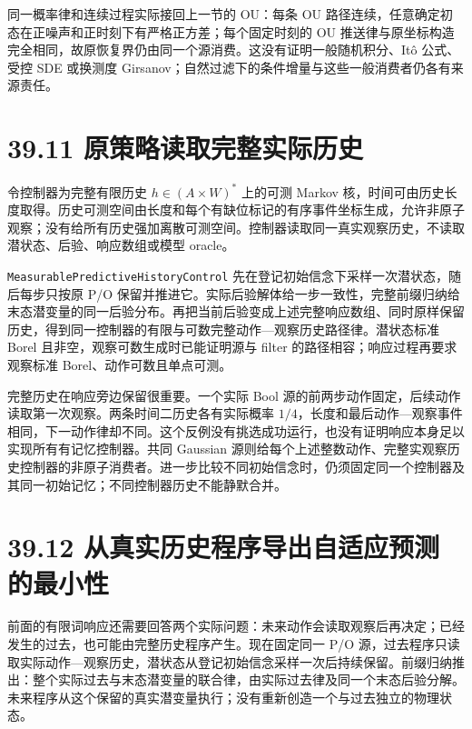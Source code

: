 \documentclass[
  11pt,
  oneside]{book}
\begin{document}
同一概率律和连续过程实际接回上一节的 OU：每条 OU 路径连续，任意确定初态在正噪声和正时刻下有严格正方差；每个固定时刻的 OU 推送律与原坐标构造完全相同，故原恢复界仍由同一个源消费。这没有证明一般随机积分、Itô 公式、受控 SDE 或换测度 Girsanov；自然过滤下的条件增量与这些一般消费者仍各有来源责任。

\section{39.11 原策略读取完整实际历史}\label{ux539fux7b56ux7565ux8bfbux53d6ux5b8cux6574ux5b9eux9645ux5386ux53f2}

令控制器为完整有限历史 \(h\in(A\times W)^*\) 上的可测 Markov 核，时间可由历史长度取得。历史可测空间由长度和每个有缺位标记的有序事件坐标生成，允许非原子观察；没有给所有历史强加离散可测空间。控制器读取同一真实观察历史，不读取潜状态、后验、响应数组或模型 oracle。

\nolinkurl{MeasurablePredictiveHistoryControl} 先在登记初始信念下采样一次潜状态，随后每步只按原 P/O 保留并推进它。实际后验解体给一步一致性，完整前缀归纳给末态潜变量的同一后验分布。再把当前后验变成上述完整响应数组、同时原样保留历史，得到同一控制器的有限与可数完整动作---观察历史路径律。潜状态标准 Borel 且非空，观察可数生成时已能证明源与 filter 的路径相容；响应过程再要求观察标准 Borel、动作可数且单点可测。

完整历史在响应旁边保留很重要。一个实际 Bool 源的前两步动作固定，后续动作读取第一次观察。两条时间二历史各有实际概率 \(1/4\)，长度和最后动作---观察事件相同，下一动作律却不同。这个反例没有挑选成功运行，也没有证明响应本身足以实现所有有记忆控制器。共同 Gaussian 源则给每个上述整数动作、完整实观察历史控制器的非原子消费者。进一步比较不同初始信念时，仍须固定同一个控制器及其同一初始记忆；不同控制器历史不能静默合并。

\section{39.12 从真实历史程序导出自适应预测的最小性}\label{ux4eceux771fux5b9eux5386ux53f2ux7a0bux5e8fux5bfcux51faux81eaux9002ux5e94ux9884ux6d4bux7684ux6700ux5c0fux6027}

前面的有限词响应还需要回答两个实际问题：未来动作会读取观察后再决定；已经发生的过去，也可能由完整历史程序产生。现在固定同一 P/O 源，过去程序只读取实际动作---观察历史，潜状态从登记初始信念采样一次后持续保留。前缀归纳推出：整个实际过去与末态潜变量的联合律，由实际过去律及同一个末态后验分解。未来程序从这个保留的真实潜变量执行；没有重新创造一个与过去独立的物理状态。
\end{document}
